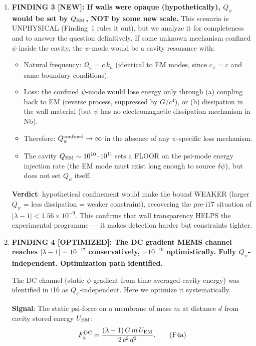 \documentclass[11pt]{article}
\newcommand{\ee}[1]{\times 10^{#1}}
\newcommand{\dpsi}{\delta\psi}
\newcommand{\Opsi}{\Omega_\psi}
\newcommand{\Qpsi}{Q_\psi}
\newcommand{\lbone}{|\lambda - 1|}
\theoremstyle{definition}
\theoremstyle{remark}
\begin{document}
\begin{tcolorbox}[colback=blue!5!white, colframe=blue!60!black,
  title=\textbf{W4i18 P2: SQMS BOUND REASSESSMENT --- 5 KEY RESULTS}]
\begin{enumerate}
\item \textbf{FINDING 3 [NEW]: If walls were opaque (hypothetically),
  $\Qpsi$ would be set by $Q_{\rm EM}$, NOT by some new scale.}
  This scenario is UNPHYSICAL (Finding~1 rules it out), but we analyze
  it for completeness and to answer the question definitively.
  If some unknown mechanism confined $\psi$ inside the cavity, the
  $\psi$-mode would be a cavity resonance with:
  \begin{itemize}[nosep]
  \item Natural frequency: $\Opsi = c\,k_n$ (identical to EM modes,
    since $c_\psi = c$ and same boundary conditions).
  \item Loss: the confined $\psi$-mode would lose energy only through
    (a) coupling back to EM (reverse process, suppressed by $G/c^4$),
    or (b) dissipation in the wall material (but $\psi$ has no
    electromagnetic dissipation mechanism in Nb).
  \item Therefore: $\Qpsi^{\rm confined} \to \infty$ in the absence
    of any $\psi$-specific loss mechanism.
  \item The cavity $Q_{\rm EM} \sim 10^{10}$--$10^{11}$ sets a FLOOR
    on the psi-mode energy injection rate (the EM mode must exist
    long enough to source $\dpsi$), but does not set $\Qpsi$ itself.
  \end{itemize}
  \textbf{Verdict}: hypothetical confinement would make the bound
  WEAKER (larger $\Qpsi$ = less dissipation = weaker constraint),
  recovering the pre-i17 situation of $\lbone < 1.56\ee{-9}$.
  This confirms that wall transparency HELPS the experimental
  programme --- it makes detection harder but constraints tighter.

\item \textbf{FINDING 4 [OPTIMIZED]: The DC gradient MEMS channel
  reaches $\lbone \sim 10^{-17}$ conservatively, $\sim 10^{-19}$
  optimistically. Fully $\Qpsi$-independent. Optimization path
  identified.}

  The DC channel (static $\psi$-gradient from time-averaged cavity
  energy) was identified in i16 as $\Qpsi$-independent. Here we
  optimize it systematically.

  \textbf{Signal}: The static psi-force on a membrane of mass $m$
  at distance $d$ from cavity stored energy $U_{\rm EM}$:
  \begin{equation}
  F_\psi^{\rm DC} = \frac{(\lambda-1)\,G\,m\,U_{\rm EM}}{2\,c^2\,d^2}.
  \tag{F4a}
  \end{equation}


\end{enumerate}
\end{tcolorbox}
\end{document}
